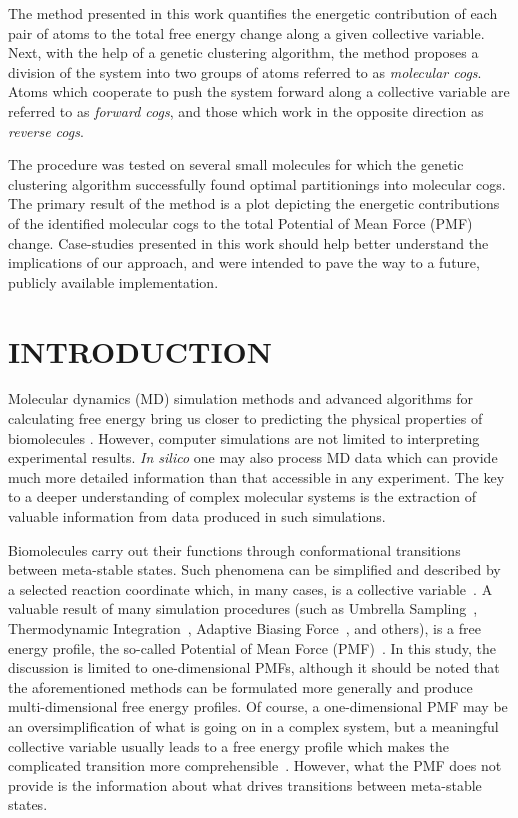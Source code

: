 The method presented in this work quantifies the energetic contribution of each pair of atoms to the total free energy change along a given collective variable.
Next, with the help of a genetic clustering algorithm, the method proposes a division of the system into two groups of atoms referred to as \emph{molecular cogs}.
Atoms which cooperate to push the system forward along a collective variable are referred to as \emph{forward cogs}, and those which work in the opposite direction as \emph{reverse cogs}.

{\color{black}The procedure was tested on several small molecules for which the genetic clustering algorithm successfully found optimal partitionings into molecular cogs.}
The primary result of the method is a {\color{black}plot} depicting the {\color{black}energetic} contributions of the identified molecular cogs to the total Potential of Mean Force (PMF) change.
{\color{black}Case-studies presented in this work should help better understand the implications of our approach, and were intended to pave the way to a future, publicly available implementation.}


\clearpage


\section*{\sffamily \Large INTRODUCTION}

Molecular dynamics (MD) simulation methods and advanced algorithms for calculating free energy bring us closer to predicting the physical properties of biomolecules \cite{woo2005calculation,chipot2014frontiers,comer2014adaptive}.
However, computer simulations are not limited to interpreting experimental results.
\emph{In silico} one may also process MD data which can provide much more detailed information than that accessible in any experiment.
The key to a deeper understanding of complex molecular systems is the extraction of valuable information from data produced in such simulations.

Biomolecules carry out their functions through conformational transitions between meta-stable states.
Such phenomena can be simplified and described by a selected reaction coordinate which, in many cases, is a collective variable~\cite{chipot2007free}.
A valuable result of many simulation procedures (such as Umbrella Sampling~\cite{torrie1977nonphysical}, Thermodynamic Integration~\cite{kirkwood1935statistical}, Adaptive Biasing Force~\cite{comer2014adaptive}, and others\cite{gumbart2012standard}), is a free energy profile, the so-called Potential of Mean Force (PMF)~\cite{kirkwood1935statistical}.
{\color{black}In this study, the discussion is limited to one-dimensional PMFs, although it should be noted that the aforementioned methods can be formulated more generally and produce multi-dimensional free energy profiles.}
Of course, a one-dimensional PMF may be an oversimplification of what is going on in a complex system, but a meaningful collective variable usually leads to a free energy profile which makes the complicated transition more comprehensible~\cite{periole2012structural,chipot2014frontiers}.
However, what the PMF does not provide is the information about what drives transitions between meta-stable states.

